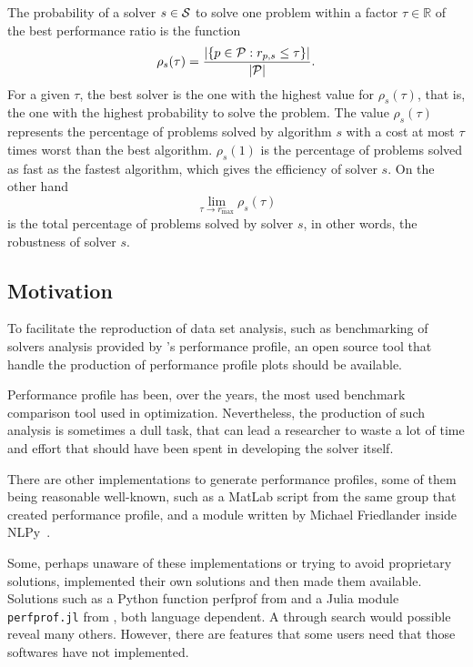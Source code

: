     The probability of a solver $s \in \mathcal{S}$  to solve one problem within a
    factor $\tau \in \mathds{R}$ of the best performance ratio is the function
    \begin{align*}
      \rho_s(\tau) = \frac{| \{p \in \mathcal{P}: r_{p,s} \leq \tau\} |}{| \mathcal{P} |}.
    \end{align*}
    For a given $\tau$, the best solver is the one with the highest value for
    $\rho_s(\tau)$, that is, the one with the highest probability to solve the
    problem.
    The value $\rho_s(\tau)$ represents the percentage of problems solved by
    algorithm $s$ with a cost at most $\tau$ times worst than the best
    algorithm. $\rho_s(1)$ is the percentage of problems solved as fast as the
    fastest algorithm, which gives the efficiency of solver $s$.
    On the other hand
    \[\displaystyle \lim_{\tau\rightarrow r^-_{\max}} \rho_s(\tau)\]
    is the total percentage of problems solved by solver $s$, in
    other words, the robustness of solver $s$.

\subsection*{Motivation}

    To facilitate the reproduction of data set analysis, such as 
    benchmarking of solvers analysis provided by \textcite{Dolan:2002du}'s
    performance profile,  an open source tool that handle
    the production of performance profile plots should be available.

    Performance profile has been, over the years, the most used benchmark
    comparison tool used in optimization. Nevertheless, the production of such
    analysis is sometimes a dull task, that can lead a researcher to waste a lot
    of time and effort that should have been spent in developing the solver
    itself.

    There are other
    implementations to generate  performance profiles,
    some of them being reasonable well-known, such as a MatLab
    script\cite{url:cops} from
    the same group that created  performance profile,
    and a module written by
    Michael Friedlander inside
    NLPy~\cite{url:NLPy}.

    Some, perhaps unaware of these implementations or trying to avoid
    proprietary solutions, implemented their own solutions and then made
    them
    available. Solutions such as a Python function perfprof from \textcite
    {url:perfprof}
    and a  Julia module {\tt perfprof.jl} from \textcite{url:perfprofjl}, 
    both language dependent. A through search would possible reveal many
    others.  However, there are features that some users need that those softwares have
    not implemented.

